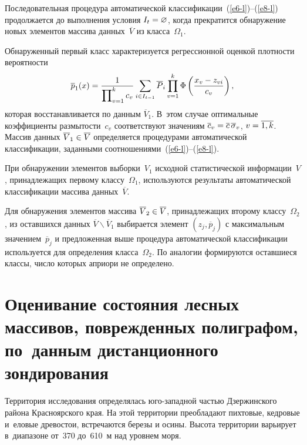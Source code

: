 \begin{multicols}{2}
  Последовательная процедура автоматической  
классификации~(\ref{e6-l})--(\ref{e8-l}) продолжается до выполнения условия 
$I_t\hm= \varnothing$, когда прекратится обнаружение новых элементов 
массива данных~$\overline{V}$ из класса~$\Omega_1$.
  
  Обнаруженный первый класс характеризуется регрессионной оценкой 
плотности вероятности
  $$
  \overline{p}_1(x) =\displaystyle\frac{\displaystyle 1\mathstrut}{\displaystyle \prod\nolimits^k_{v=1} c_v\mathstrut} \sum\limits_{i\in I_{t-
1}} \overline{P}_i \prod\limits^k_{v=1} \Phi \left( \displaystyle\frac{\displaystyle x_v-z_{vi}\mathstrut}{\displaystyle c_v\mathstrut}\right),
  $$
которая восстанавливается по данным $\overline{V}_1$. В~этом случае 
оптимальные коэффициенты размытости~$c_v$ соответствуют значениям 
$\overline{c}_v\hm= \overline{c} \,\overline{\sigma}_v$, $v\hm=\overline{1,k}$. 
Массив данных $\overline{V}_1\hm\in \overline{V}$ определяется процедурами 
автоматической классификации, заданными  
соотношениями~(\ref{e6-l})--(\ref{e8-l}).
  
  При обнаружении элементов выборки~$V_1$ исходной статистической 
информации~$V$, принадлежащих первому классу~$\Omega_1$, используются 
результаты автоматической классификации массива данных~$\overline{V}$.
  
  Для обнаружения элементов массива $\overline{V}_2\hm\in \overline{V}$, 
принадлежащих второму классу~$\Omega_2$, из оставшихся данных 
$\overline{V}\backslash\overline{V}_1$ выбирается элемент $(z_j, 
\overline{p}_j)$ с максимальным значением~$\overline{p}_j$ и предложенная 
выше процедура автоматической классификации используется для определения 
класса~$\Omega_2$. По аналогии формируются оставшиеся классы, число 
которых априори не определено.

\vspace*{-6pt}
  
\section{Оценивание состояния лесных массивов, поврежденных 
полиграфом, по~данным дистанционного зондирования}

\vspace*{-3pt}

  Территория исследования определялась юго-за\-пад\-ной частью Дзержинского 
района Красноярского края. На этой территории преобладают пихтовые, 
кедровые и~еловые древостои, встречаются березы и осины. Высота территории 
варьирует в~диапазоне от~370 до~610~м над уровнем моря.



\end{multicols}
